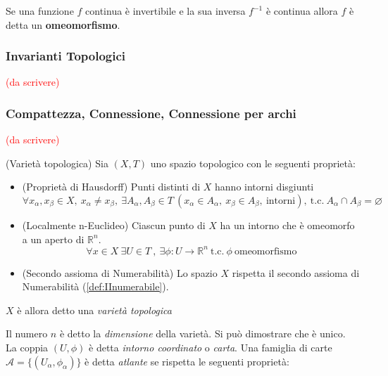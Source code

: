 Se una funzione $f$ continua è invertibile e la sua inversa $f^{-1}$ è continua allora
$f$ è detta un \textbf{omeomorfismo}.
\subsubsection{Invarianti Topologici}
\textcolor{red}{(da scrivere)}
\subsubsection{Compattezza, Connessione, Connessione per archi}
\textcolor{red}{(da scrivere)}
\begin{definition}{(Varietà topologica)}
\label{def:var_topologica}
   Sia $(X ,T)$ uno spazio topologico con le seguenti proprietà:
  \begin{itemize}
     \item (Proprietà di Hausdorff) Punti distinti di $X$ hanno intorni disgiunti
     $$\forall x_\alpha,x_\beta \in X, \: x_\alpha \neq x_\beta , \:
       \exists A_\alpha , A_\beta \in T \: (x_\alpha \in A_\alpha , \:
       x_\beta \in A_\beta ,\: \mathrm{intorni}), \: \mathrm{t.c.} \: A_\alpha \cap A_\beta = \varnothing $$
     \item (Localmente n-Euclideo) Ciascun punto di $X$ ha un intorno che è
     omeomorfo a un aperto di $\mathbb{R}^n$.
     $$
       \forall x \in X \: \exists U \in T \:,\: \exists\phi : U \to \mathbb{R}^n
          \mathrm{\: t.c.\:} \phi \mathrm{\: omeomorfismo}
     $$
     \item (Secondo assioma di Numerabilità) Lo spazio $X$ rispetta il secondo assioma di Numerabilità (\ref{def:IInumerabile}).
  \end{itemize}
  $X$ è allora detto una \emph{varietà topologica}
\end{definition}
Il numero $n$ è detto la \emph{dimensione} della varietà. Si può dimostrare che è unico.\\
La coppia $(U,\phi)$ è detta \emph{intorno coordinato} o \emph{carta}.
Una famiglia di carte $\mathcal{A} = \{ (U_\alpha , \phi_\alpha) \}$ è detta
\emph{atlante} se rispetta le seguenti proprietà:
